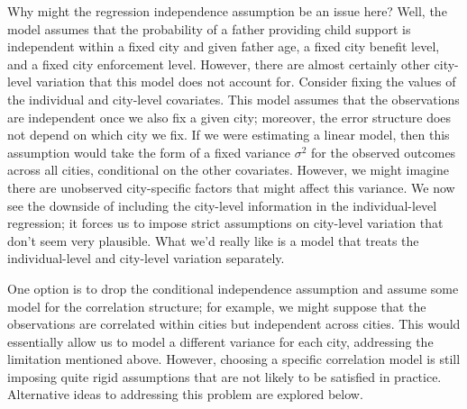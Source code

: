 \documentclass[12pt]{article}
\begin{document}
Why might the regression independence assumption be an issue here? Well, the model assumes that the probability of a father providing 
child support is independent within a fixed city and given father age, a fixed city benefit level, and a fixed city enforcement level. However, there are almost certainly other city-level variation that this model 
does not account for. Consider fixing the values of the individual and city-level covariates. This model assumes that the observations are independent once we also fix a given city; moreover, the error structure
does not depend on which city we fix. If we were estimating a linear model, then this assumption would take the form of a fixed variance $\sigma^2$ for the observed outcomes across all cities, conditional 
on the other covariates. However, we might imagine there are unobserved city-specific factors that might affect this variance. We now see the downside of including the city-level information in the individual-level 
regression; it forces us to impose strict assumptions on city-level variation that don't seem very plausible. What we'd really like is a model that treats the individual-level and city-level variation separately. 

One option is to drop the conditional independence assumption and assume some model for the correlation structure; for example, we might suppose that the observations are correlated within cities but independent
across cities. This would essentially allow us to model a different variance for each city, addressing the limitation mentioned above. However, choosing a specific correlation model is still imposing quite rigid assumptions
that are not likely to be satisfied in practice. Alternative ideas to addressing this problem are explored below. 
\end{document}
